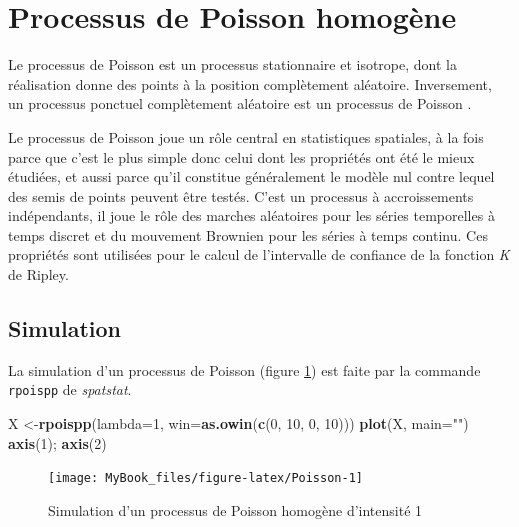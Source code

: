 \documentclass[
  11pt,
  french,
  A4paper,
  extrafontsizes,onecolumn,openright
  ]{memoir}
\newenvironment{Shaded}{\begin{snugshade}}{\end{snugshade}}
\newcommand{\KeywordTok}[1]{\textcolor[rgb]{0.13,0.29,0.53}{\textbf{#1}}}
\newcommand{\DataTypeTok}[1]{\textcolor[rgb]{0.13,0.29,0.53}{#1}}
\newcommand{\DecValTok}[1]{\textcolor[rgb]{0.00,0.00,0.81}{#1}}
\newcommand{\StringTok}[1]{\textcolor[rgb]{0.31,0.60,0.02}{#1}}
\newcommand{\NormalTok}[1]{#1}
\theoremstyle{definition}
\theoremstyle{definition}
\theoremstyle{definition}
\theoremstyle{remark}
\begin{document}
\section{Processus de Poisson
homogène}\label{processus-de-poisson-homogene}

Le processus de Poisson est un processus stationnaire et isotrope, dont
la réalisation donne des points à la position complètement aléatoire.
Inversement, un processus ponctuel complètement aléatoire est un
processus de Poisson \autocite[démonstration :][pp.~51-52]{Diggle1983}.

Le processus de Poisson joue un rôle central en statistiques spatiales,
à la fois parce que c'est le plus simple donc celui dont les propriétés
ont été le mieux étudiées, et aussi parce qu'il constitue généralement
le modèle nul contre lequel des semis de points peuvent être testés.
C'est un processus à accroissements indépendants, il joue le rôle des
marches aléatoires pour les séries temporelles à temps discret et du
mouvement Brownien pour les séries à temps continu. Ces propriétés sont
utilisées pour le calcul de l'intervalle de confiance de la fonction
\emph{K} de Ripley.

\subsection{Simulation}\label{simulation}

La simulation d'un processus de Poisson (figure \ref{fig:Poisson}) est
faite par la commande \texttt{rpoispp} de \emph{spatstat}.

\begin{Shaded}
\begin{Highlighting}[]
\NormalTok{X <-}\KeywordTok{rpoispp}\NormalTok{(}\DataTypeTok{lambda=}\DecValTok{1}\NormalTok{, }\DataTypeTok{win=}\KeywordTok{as.owin}\NormalTok{(}\KeywordTok{c}\NormalTok{(}\DecValTok{0}\NormalTok{, }\DecValTok{10}\NormalTok{, }\DecValTok{0}\NormalTok{, }\DecValTok{10}\NormalTok{)))}
\KeywordTok{plot}\NormalTok{(X, }\DataTypeTok{main=}\StringTok{""}\NormalTok{)}
\KeywordTok{axis}\NormalTok{(}\DecValTok{1}\NormalTok{); }\KeywordTok{axis}\NormalTok{(}\DecValTok{2}\NormalTok{)}
\end{Highlighting}
\end{Shaded}

\begin{figure}

{\centering \texttt{[image: MyBook\_files/figure-latex/Poisson-1]} 

}

\caption{Simulation d’un processus de Poisson homogène d’intensité 1}\label{fig:Poisson}
\end{figure}
\end{document}
